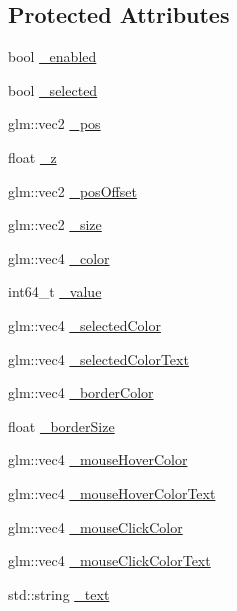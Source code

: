 \subsection*{Protected Attributes}
\begin{DoxyCompactItemize}
\item 
bool \hyperlink{class_a_base_u_i_a82f9adf5735be7a4ad378b965a8a7125}{\+\_\+enabled}
\item 
bool \hyperlink{class_a_base_u_i_aa8591df596571dddb7b0ef87fbd02f69}{\+\_\+selected}
\item 
glm\+::vec2 \hyperlink{class_a_base_u_i_a75c94f0cfee77b3af510262e334142cb}{\+\_\+pos}
\item 
float \hyperlink{class_a_base_u_i_a986f2d7749ff6696048a54655d666c43}{\+\_\+z}
\item 
glm\+::vec2 \hyperlink{class_a_base_u_i_a8e2e3ca870d800e5d51551abf0264d62}{\+\_\+pos\+Offset}
\item 
glm\+::vec2 \hyperlink{class_a_base_u_i_ae0e631b6fae3845ce944e047046ef20f}{\+\_\+size}
\item 
glm\+::vec4 \hyperlink{class_a_base_u_i_a9c8d48d8e1f311464af573ce44e61a8c}{\+\_\+color}
\item 
int64\+\_\+t \hyperlink{class_a_base_u_i_acaf5cb113d55cb7b2ab58c9834889936}{\+\_\+value}
\item 
glm\+::vec4 \hyperlink{class_a_base_u_i_a9196333d9132c5d77ad9fe0b433cabd1}{\+\_\+selected\+Color}
\item 
glm\+::vec4 \hyperlink{class_a_base_u_i_a9baedc9a4fa1b9a337ab07a341bb7d3b}{\+\_\+selected\+Color\+Text}
\item 
glm\+::vec4 \hyperlink{class_a_base_u_i_a27c378b1380fdce4db9fb03d43684b93}{\+\_\+border\+Color}
\item 
float \hyperlink{class_a_base_u_i_a0d7dc2812e933321513551b5c803a100}{\+\_\+border\+Size}
\item 
glm\+::vec4 \hyperlink{class_a_base_u_i_aebbf27b207374a6430cc7b66299f2846}{\+\_\+mouse\+Hover\+Color}
\item 
glm\+::vec4 \hyperlink{class_a_base_u_i_a53e79f69ed0c96246d59d113831534e8}{\+\_\+mouse\+Hover\+Color\+Text}
\item 
glm\+::vec4 \hyperlink{class_a_base_u_i_a13e2f41345b37ed5998d93f98fba5f88}{\+\_\+mouse\+Click\+Color}
\item 
glm\+::vec4 \hyperlink{class_a_base_u_i_a6353aeb00c74bb66c65eecb23ff63788}{\+\_\+mouse\+Click\+Color\+Text}
\item 
std\+::string \hyperlink{class_a_base_u_i_ada813403e994b73c08d1d069a322e712}{\+\_\+text}

\end{DoxyCompactItemize}
